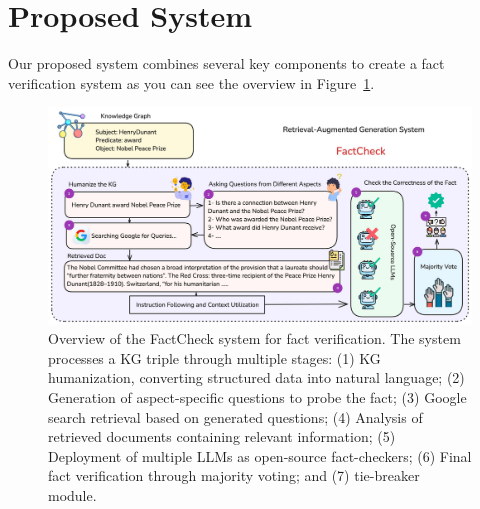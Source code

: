 \section{Proposed System}\label{sec:approach}
Our proposed system combines several key components to create a fact verification system as you can see the overview in Figure~\ref{fig:factcheck-overview}.
\begin{figure}[ht!]
    \centering
    \begin{minipage}[b]{\textwidth}
        \centering
        \includegraphics[width=\textwidth]{res/FactCheckOverview}
        \caption{Overview of the FactCheck system for fact verification. The system processes a \ac{KG} triple through multiple stages: (1) \ac{KG} humanization, converting structured data into natural language; (2) Generation of aspect-specific questions to probe the fact; (3) Google search retrieval based on generated questions; (4) Analysis of retrieved documents containing relevant information; (5) Deployment of multiple \ac{LLMs} as open-source fact-checkers; (6) Final fact verification through majority voting; and (7) tie-breaker module.}
        \label{fig:factcheck-overview}
    \end{minipage}
\end{figure}
\newpage

